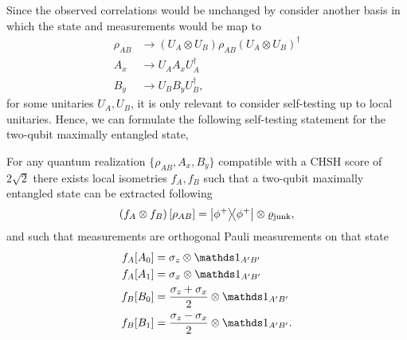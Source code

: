 Since the observed correlations would be unchanged by consider another basis in which the state and measurements would be map to
\begin{equation}
	\begin{split}
		\rho_{AB} &\rightarrow \left(U_A \otimes U_B\right)\rho_{AB}\left(U_A \otimes U_B\right)^\dag \\
		A_x &\rightarrow U_A A_x U_A^\dag \\
		B_y &\rightarrow U_B B_y U_B^\dag ,
	\end{split}	
\end{equation}
for some unitaries $U_A,U_B$, it is only relevant to consider self-testing up to local unitaries.
Hence, we can formulate the following self-testing statement for the two-qubit maximally entangled state,
\begin{theorem}
	For any quantum realization $\{\rho_{AB},A_x,B_y\}$ compatible with a CHSH score of $2\sqrt{2}$ there exists local isometries $f_A,f_B$ such that a two-qubit maximally entangled state can be extracted following
	\begin{displaymath}
		\left(f_A \otimes f_B\right) [\rho_{AB}] = \ketbra{\phi^+} \otimes \varrho_\text{junk},
	\end{displaymath}
	and such that measurements are orthogonal Pauli measurements on that state
	\begin{equation}
		\nonumber
		\begin{split}
			f_A [A_0] &= \sigma_z \otimes \id_{A'B'} \\
			f_A [A_1] &= \sigma_x \otimes \id_{A'B'} \\
			f_B [B_0] &= \frac{\sigma_z+\sigma_x}{2} \otimes \id_{A'B'} \\
			f_B [B_1] &= \frac{\sigma_z-\sigma_x}{2} \otimes \id_{A'B'}. 
		\end{split}
	\end{equation}
\end{theorem}



